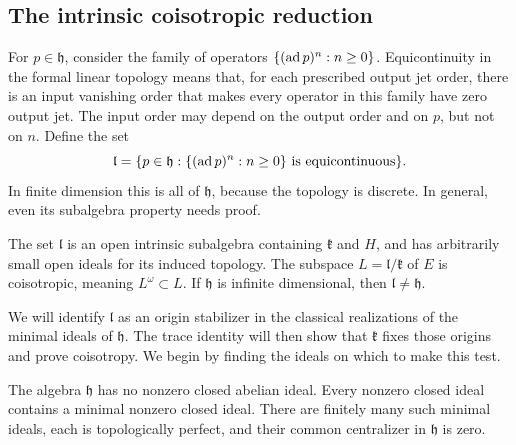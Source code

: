 \subsection{The intrinsic coisotropic reduction}

For $p\in\mathfrak h$, consider the family of operators
$\{(\operatorname{ad} p)^n:n\ge0\}$. Equicontinuity in the formal linear topology
means that, for each prescribed output jet order, there is an input
vanishing order that makes every operator in this family have zero
output jet. The input order may depend on the output order and on $p$,
but not on $n$. Define the set
\begin{equation}
 \mathfrak l=\{p\in\mathfrak h:
       \{(\operatorname{ad} p)^n:n\ge0\}\text{ is equicontinuous}\}.
 \label{alg:equicontinuity}
\end{equation}
In finite dimension this is all of $\mathfrak h$, because the topology
is discrete. In general, even its subalgebra property needs proof.

\begin{proposition}
\label{alg:coisotropic}
The set $\mathfrak l$ is an open intrinsic subalgebra containing
$\mathfrak k$ and $H$, and has arbitrarily small open ideals for its
induced topology. The subspace $L=\mathfrak l/\mathfrak k$ of $E$ is
coisotropic, meaning $L^\omega\subset L$. If $\mathfrak h$ is infinite
dimensional, then $\mathfrak l\ne\mathfrak h$.
\end{proposition}

We will identify $\mathfrak l$ as an origin stabilizer in the classical
realizations of the minimal ideals of $\mathfrak h$. The trace identity
will then show that $\mathfrak k$ fixes those origins and prove
coisotropy. We begin by finding the ideals on which to make this test.

\begin{lemma}
\label{alg:minimal-ideals}
The algebra $\mathfrak h$ has no nonzero closed abelian ideal. Every
nonzero closed ideal contains a minimal nonzero closed ideal. There
are finitely many such minimal ideals, each is topologically perfect,
and their common centralizer in $\mathfrak h$ is zero.
\end{lemma}

